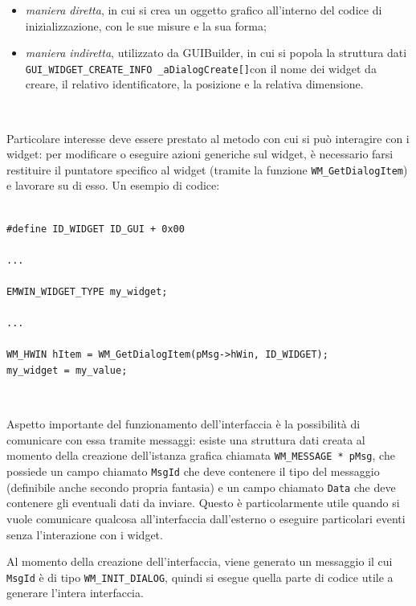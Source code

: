 \documentclass[a4paper,titlepage]{book}
\newcommand{\itema}{\begin{itemize}[noitemsep,topsep=10pt,parsep=5pt,partopsep=10pt]}
\newcommand{\code}{\lstinline}
\begin{document}
\itema

\item \textit{maniera diretta}, in cui si crea un oggetto grafico all'interno del codice di inizializzazione, con le sue misure e la sua forma;

\item \textit{maniera indiretta}, utilizzato da GUIBuilder, in cui si popola la struttura dati \newline \code!GUI_WIDGET_CREATE_INFO _aDialogCreate[]!\newline con il nome dei widget da creare, il relativo identificatore, la posizione e la relativa dimensione.

\end{itemize}

~

Particolare interesse deve essere prestato al metodo con cui si può interagire con i widget: per modificare o eseguire azioni generiche sul widget, è necessario farsi restituire il puntatore specifico al widget (tramite la funzione \code!WM_GetDialogItem!) e lavorare su di esso. Un esempio di codice:

\begin{lstlisting}

#define ID_WIDGET ID_GUI + 0x00

...

EMWIN_WIDGET_TYPE my_widget;

...

WM_HWIN hItem = WM_GetDialogItem(pMsg->hWin, ID_WIDGET);
my_widget = my_value; 

\end{lstlisting}

~

Aspetto importante del funzionamento dell'interfaccia è la possibilità di comunicare con essa tramite messaggi: esiste una struttura dati creata al momento della creazione dell'istanza grafica chiamata \code!WM_MESSAGE * pMsg!, che possiede un campo chiamato \code!MsgId! che deve contenere il tipo del messaggio (definibile anche secondo propria fantasia) e un campo chiamato \code!Data! che deve contenere gli eventuali dati da inviare. Questo è particolarmente utile quando si vuole comunicare qualcosa all'interfaccia dall'esterno o eseguire particolari eventi senza l'interazione con i widget.

Al momento della creazione dell'interfaccia, viene generato un messaggio il cui \code!MsgId! è di tipo \code!WM_INIT_DIALOG!, quindi si esegue quella parte di codice utile a generare l'intera interfaccia.
\end{document}
